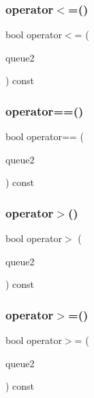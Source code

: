 \mbox{\label{classQueue_aea83f9b16703e7b7a1e46e0746f608c0}} 
\subsubsection{\texorpdfstring{operator$<$=()}{operator<=()}}
{\footnotesize\ttfamily bool operator$<$= (\begin{DoxyParamCaption}\item[{const \mbox{\hyperlink{classQueue}{Queue}}$<$ Value\+Type $>$ \&}]{queue2 }\end{DoxyParamCaption}) const}

\mbox{\label{classQueue_a85514d93aa9c51e072e2f16ed37ee889}} 
\subsubsection{\texorpdfstring{operator==()}{operator==()}}
{\footnotesize\ttfamily bool operator== (\begin{DoxyParamCaption}\item[{const \mbox{\hyperlink{classQueue}{Queue}}$<$ Value\+Type $>$ \&}]{queue2 }\end{DoxyParamCaption}) const}

\mbox{\label{classQueue_afb42a4f29f0857da53e102eb8f77eea6}} 
\subsubsection{\texorpdfstring{operator$>$()}{operator>()}}
{\footnotesize\ttfamily bool operator$>$ (\begin{DoxyParamCaption}\item[{const \mbox{\hyperlink{classQueue}{Queue}}$<$ Value\+Type $>$ \&}]{queue2 }\end{DoxyParamCaption}) const}

\mbox{\label{classQueue_ad18096c65e1e4666a4103b559d2c2acd}} 
\subsubsection{\texorpdfstring{operator$>$=()}{operator>=()}}
{\footnotesize\ttfamily bool operator$>$= (\begin{DoxyParamCaption}\item[{const \mbox{\hyperlink{classQueue}{Queue}}$<$ Value\+Type $>$ \&}]{queue2 }\end{DoxyParamCaption}) const}

